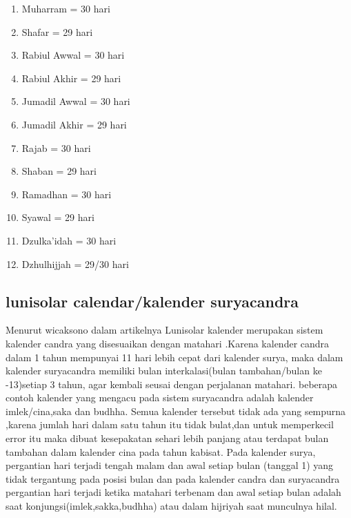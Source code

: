     \begin{enumerate}
        \item Muharram      = 30 hari
        \item Shafar        = 29 hari
        \item Rabiul Awwal  = 30 hari
        \item Rabiul Akhir  = 29 hari
        \item Jumadil Awwal = 30 hari
        \item Jumadil Akhir = 29 hari
        \item Rajab         = 30 hari
        \item Shaban        = 29 hari
        \item Ramadhan      = 30 hari
        \item Syawal        = 29 hari
        \item Dzulka'idah   = 30 hari
        \item Dzhulhijjah   = 29/30 hari
    \end{enumerate}

  \subsection{lunisolar calendar/kalender suryacandra}
      Menurut wicaksono dalam artikelnya Lunisolar kalender merupakan sistem kalender candra yang disesuaikan dengan matahari \cite{wicaksono2008ta}.Karena kalender candra dalam 1 tahun mempunyai 11 hari lebih cepat dari kalender surya, maka dalam kalender suryacandra memiliki bulan interkalasi(bulan tambahan/bulan ke -13)setiap 3 tahun, agar kembali seusai dengan perjalanan matahari.
    beberapa contoh kalender yang mengacu pada sistem suryacandra adalah kalender imlek/cina,saka dan budhha. Semua kalender tersebut tidak ada yang sempurna ,karena jumlah hari dalam satu tahun itu tidak bulat,dan untuk memperkecil error itu maka dibuat kesepakatan sehari lebih panjang atau terdapat bulan tambahan dalam kalender cina pada tahun kabisat\cite{wicaksono2008ta}.
    Pada kalender surya, pergantian hari terjadi tengah malam dan awal setiap bulan (tanggal 1) yang tidak tergantung pada posisi bulan dan pada kalender candra dan suryacandra pergantian hari terjadi ketika matahari terbenam dan awal setiap bulan adalah saat konjungsi(imlek,sakka,budhha) atau dalam hijriyah saat munculnya hilal.
